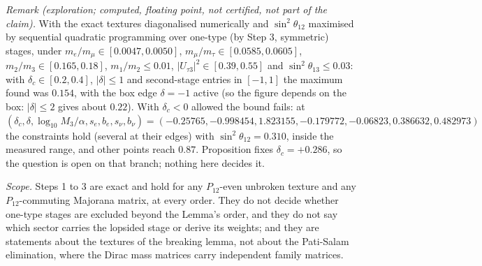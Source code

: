 \emph{Remark (exploration; computed, floating point, not certified, not part of the claim).} With the exact textures diagonalised numerically and $\sin^{2}\theta_{12}$ maximised by sequential quadratic programming over one-type (by Step 3, symmetric) stages, under $m_{e}/m_{\mu} \in [0.0047, 0.0050]$, $m_{\mu}/m_{\tau} \in [0.0585, 0.0605]$, $m_{2}/m_{3} \in [0.165, 0.18]$, $m_{1}/m_{2} \le 0.01$, $|U_{\tau 3}|^{2} \in [0.39, 0.55]$ and $\sin^{2}\theta_{13} \le 0.03$: with $\delta_{c} \in [0.2, 0.4]$, $|\delta| \le 1$ and second-stage entries in $[-1, 1]$ the maximum found was $0.154$, with the box edge $\delta = -1$ active (so the figure depends on the box: $|\delta| \le 2$ gives about $0.22$). With $\delta_{c} < 0$ allowed the bound fails: at $(\delta_{c}, \delta, \log_{10}M_{3}/\alpha, s_{e}, b_{e}, s_{\nu}, b_{\nu}) = (-0.25765, -0.998454, 1.823155, -0.179772, -0.06823, 0.386632, 0.482973)$ the constraints hold (several at their edges) with $\sin^{2}\theta_{12} = 0.310$, inside the measured range, and other points reach $0.87$. Proposition  fixes $\delta_{c} = +0.286$, so the question is open on that branch; nothing here decides it.

\emph{Scope.} Steps 1 to 3 are exact and hold for any $P_{12}$-even unbroken texture and any $P_{12}$-commuting Majorana matrix, at every order. They do not decide whether one-type stages are excluded beyond the Lemma's order, and they do not say which sector carries the lopsided stage or derive its weights; and they are statements about the textures of the breaking lemma, not about the Pati-Salam elimination, where the Dirac mass matrices carry independent family matrices.
